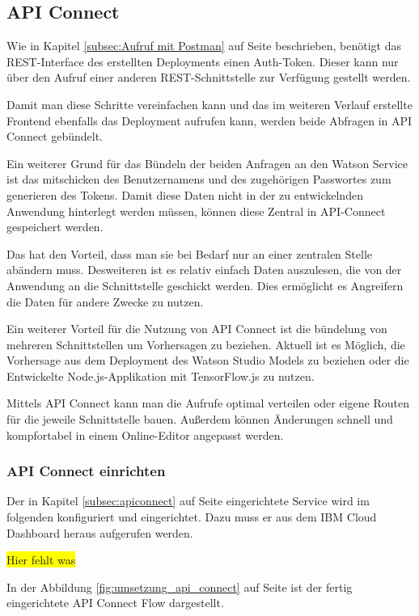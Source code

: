 \subsection{API Connect}
Wie in Kapitel \ref{subsec:Aufruf mit Postman} auf Seite \pageref{subsec:Aufruf mit Postman} beschrieben, benötigt das
REST-Interface des erstellten Deployments einen Auth-Token. Dieser kann nur über den Aufruf einer anderen
REST-Schnittstelle zur Verfügung gestellt werden.

Damit man diese Schritte vereinfachen kann und das im weiteren Verlauf erstellte Frontend ebenfalls das Deployment aufrufen
kann, werden beide Abfragen in API Connect gebündelt.

Ein weiterer Grund für das Bündeln der beiden Anfragen an den Watson Service ist das mitschicken des Benutzernamens und
des zugehörigen Passwortes zum generieren des Tokens. Damit diese Daten nicht in der zu entwickelnden Anwendung hinterlegt
werden müssen, können diese Zentral in API-Connect gespeichert werden.

Das hat den Vorteil, dass man sie bei Bedarf nur an einer zentralen Stelle abändern muss. Desweiteren ist es relativ
einfach Daten auszulesen, die von der Anwendung an die Schnittstelle geschickt werden. Dies ermöglicht es Angreifern die
Daten für andere Zwecke zu nutzen.

Ein weiterer Vorteil für die Nutzung von API Connect ist die bündelung von mehreren Schnittstellen um Vorhersagen zu
beziehen. Aktuell ist es Möglich, die Vorhersage aus dem Deployment des Watson Studio Models zu beziehen oder die
Entwickelte Node.js-Applikation mit TensorFlow.js zu nutzen.

Mittels API Connect kann man die Aufrufe optimal verteilen oder eigene Routen für die jeweile Schnittstelle bauen.
Außerdem können Änderungen schnell und kompfortabel in einem Online-Editor angepasst werden.

\subsubsection{API Connect einrichten}
Der in Kapitel \ref{subsec:apiconnect} auf Seite \pageref{subsec:apiconnect} eingerichtete Service wird im folgenden
konfiguriert und eingerichtet. Dazu muss er aus dem IBM Cloud Dashboard heraus aufgerufen werden.

\colorbox{yellow}{Hier fehlt was}

In der Abbildung \ref{fig:umsetzung_api_connect} auf Seite \pageref{fig:umsetzung_api_connect} ist der fertig
eingerichtete API Connect Flow dargestellt.

